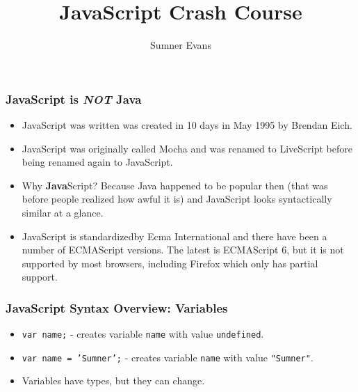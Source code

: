 \documentclass{lug}
\title{JavaScript Crash Course}
\author{Sumner Evans}
\begin{document}
\begin{frame}
    \frametitle{JavaScript is \textbf{\textit{NOT}} Java \footnotemark[1]}

    \begin{itemize}[<+->]
        \item JavaScript was written was created in 10 days in May 1995 by Brendan Eich.
        \item JavaScript was originally called Mocha and was renamed to LiveScript before being
            renamed again to JavaScript.
        \item Why \textbf{Java}Script? Because Java happened to be popular then (that was before
            people realized how awful it is) and JavaScript looks syntactically similar at a glance.
        \item JavaScript is standardized\footnotemark[2] by Ecma International and there have been a
            number of ECMAScript versions. The latest is ECMAScript 6, but it is not supported by
            most browsers, including Firefox which only has partial support.
    \end{itemize}

\end{frame}

\begin{frame}
    \frametitle{JavaScript Syntax Overview: Variables}

    \begin{itemize}
        \item \texttt{var name;} - creates variable \texttt{name} with value \texttt{undefined}.
        \item \texttt{var name = 'Sumner';} - creates variable \texttt{name} with value
            \texttt{"Sumner"}.
        \item Variables have types, but they can change.
    \end{itemize}

%
\end{frame}
\end{document}
